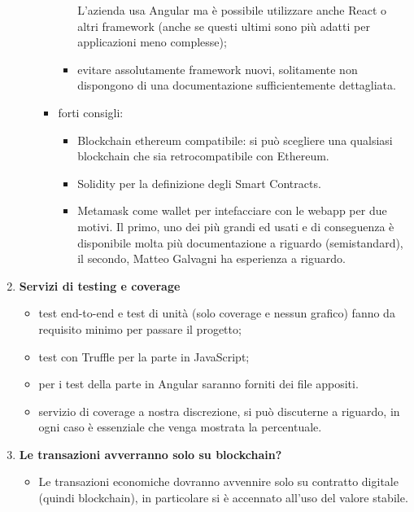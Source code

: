 \begin{enumerate}
\begin{itemize}
\begin{itemize}
\begin{itemize}
                    L'azienda usa Angular ma è possibile utilizzare anche React o altri framework (anche se questi ultimi sono più adatti per applicazioni meno complesse);
                    \item evitare assolutamente framework nuovi, solitamente non dispongono di una documentazione sufficientemente dettagliata.
                \end{itemize}
                \item{forti consigli:}
                \begin{itemize}
                    \item Blockchain ethereum compatibile: si può scegliere una qualsiasi blockchain che sia retrocompatibile con Ethereum.
                    \item Solidity per la definizione degli Smart Contracts.
                    \item Metamask come wallet per intefacciare con le webapp per due motivi. Il primo, uno dei più grandi ed usati e di conseguenza è disponibile molta più documentazione a riguardo (semistandard), il secondo, Matteo Galvagni ha esperienza a riguardo.
                \end{itemize}
            \end{itemize}
        \end{itemize}
    \item \textbf{Servizi di testing e coverage}
        \begin{itemize}
            \item test end-to-end e test di unità (solo coverage e nessun grafico) fanno da requisito minimo per passare il progetto;
            \item test con Truffle per la parte in JavaScript;
            \item per i test della parte in Angular saranno forniti dei file appositi.
            \item servizio di coverage a nostra discrezione, si può discuterne a riguardo, in ogni caso è essenziale che venga mostrata la percentuale.
        \end{itemize}
    \item \textbf{Le transazioni avverranno solo su blockchain?}
        \begin{itemize}
            \item Le transazioni economiche dovranno avvennire solo su contratto digitale (quindi blockchain), in particolare si è accennato all'uso del valore stabile.
        \end{itemize}
\end{enumerate}





